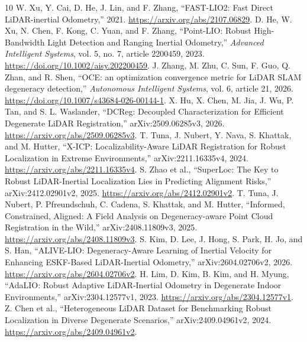 \documentclass[11pt,a4paper]{article}
\begin{document}
\begin{thebibliography}{10}
 W. Xu, Y. Cai, D. He, J. Lin, and F. Zhang,
``FAST-LIO2: Fast Direct LiDAR-inertial Odometry,'' 2021.
\url{https://arxiv.org/abs/2107.06829}.
 D. He, W. Xu, N. Chen, F. Kong, C. Yuan, and F. Zhang,
``Point-LIO: Robust High-Bandwidth Light Detection and Ranging Inertial
Odometry,'' \emph{Advanced Intelligent Systems}, vol. 5, no. 7,
article 2200459, 2023. \url{https://doi.org/10.1002/aisy.202200459}.
 J. Zhang, M. Zhu, C. Sun, F. Guo, Q. Zhan, and R. Shen,
``OCE: an optimization convergence metric for LiDAR SLAM degeneracy
detection,'' \emph{Autonomous Intelligent Systems}, vol. 6, article 21,
2026. \url{https://doi.org/10.1007/s43684-026-00144-1}.
 X. Hu, X. Chen, M. Jia, J. Wu, P. Tan, and S. L. Waslander,
``DCReg: Decoupled Characterization for Efficient Degenerate LiDAR
Registration,'' arXiv:2509.06285v3, 2026.
\url{https://arxiv.org/abs/2509.06285v3}.
 T. Tuna, J. Nubert, Y. Nava, S. Khattak, and M. Hutter,
``X-ICP: Localizability-Aware LiDAR Registration for Robust Localization in
Extreme Environments,'' arXiv:2211.16335v4, 2024.
\url{https://arxiv.org/abs/2211.16335v4}.
 S. Zhao et al., ``SuperLoc: The Key to Robust
LiDAR-Inertial Localization Lies in Predicting Alignment Risks,''
arXiv:2412.02901v2, 2025. \url{https://arxiv.org/abs/2412.02901v2}.
 T. Tuna, J. Nubert, P. Pfreundschuh, C. Cadena,
S. Khattak, and M. Hutter, ``Informed, Constrained, Aligned: A Field
Analysis on Degeneracy-aware Point Cloud Registration in the Wild,''
arXiv:2408.11809v3, 2025. \url{https://arxiv.org/abs/2408.11809v3}.
 S. Kim, D. Lee, J. Hong, S. Park, H. Jo, and S. Han,
``ALIVE-LIO: Degeneracy-Aware Learning of Inertial Velocity for Enhancing
ESKF-Based LiDAR-Inertial Odometry,'' arXiv:2604.02706v2, 2026.
\url{https://arxiv.org/abs/2604.02706v2}.
 H. Lim, D. Kim, B. Kim, and H. Myung,
``AdaLIO: Robust Adaptive LiDAR-Inertial Odometry in Degenerate Indoor
Environments,'' arXiv:2304.12577v1, 2023.
\url{https://arxiv.org/abs/2304.12577v1}.
 Z. Chen et al., ``Heterogeneous LiDAR Dataset for
Benchmarking Robust Localization in Diverse Degenerate Scenarios,''
arXiv:2409.04961v2, 2024. \url{https://arxiv.org/abs/2409.04961v2}.
\end{thebibliography}
\end{document}
